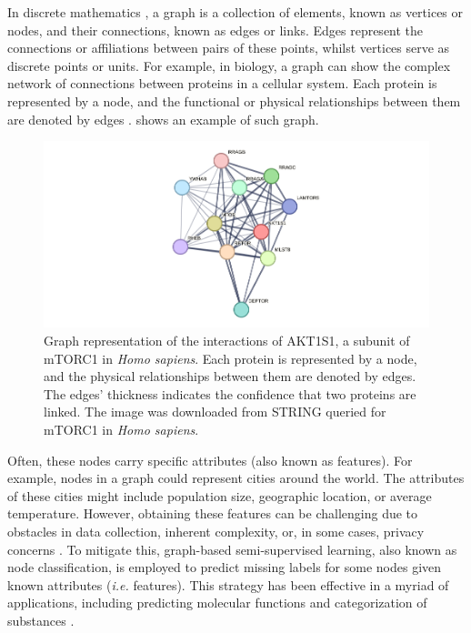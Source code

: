 \documentclass[
11pt, %
oneside, %
english, %
singlespacing, %
headsepline, %
chapterinoneline, %
]{MastersDoctoralThesis} %
\begin{document}
In discrete mathematics \cite{johnsonbaughDiscreteMathematics2018}, a graph is a collection of elements, known as vertices or nodes, and their connections, known as edges or links. Edges represent the connections or affiliations between pairs of these points, whilst vertices serve as discrete points or units. For example, in biology, a graph can show the complex network of connections between proteins in a cellular system. Each protein is represented by a node, and the functional or physical relationships between them are denoted by edges \cite{trudeauIntroductionGraphTheory1993}.  shows an example of such graph.

\begin{figure}[h]
	\centering
	\includegraphics[scale=0.5]{figure/mtor}
	\caption{Graph representation of the interactions of AKT1S1, a subunit of mTORC1 in \textit{Homo sapiens}. Each protein is represented by a node, and the physical relationships between them are denoted by edges. The edges' thickness indicates the confidence that two proteins are linked. The image was downloaded from STRING \cite{szklarczykSTRINGV10Protein2015} queried for mTORC1 in \textit{Homo sapiens}.}
	\label{fig:mTOR}
\end{figure}

Often, these nodes carry specific attributes (also known as features). For example, nodes in a graph could represent cities around the world. The attributes of these cities might include population size, geographic location, or average temperature. However, obtaining these features can be challenging due to obstacles in data collection, inherent complexity, or, in some cases, privacy concerns \cite{jiaGraphBeliefPropagation2021}. To mitigate this, graph-based semi-supervised learning, also known as node classification, is employed to predict missing labels for some nodes given known attributes (\textit{i.e.} features). This strategy has been effective in a myriad of applications, including predicting molecular functions and categorization of substances \cite{NIPS2016_390e9825, liDeeperInsightsGraph2018}.
\end{document}

